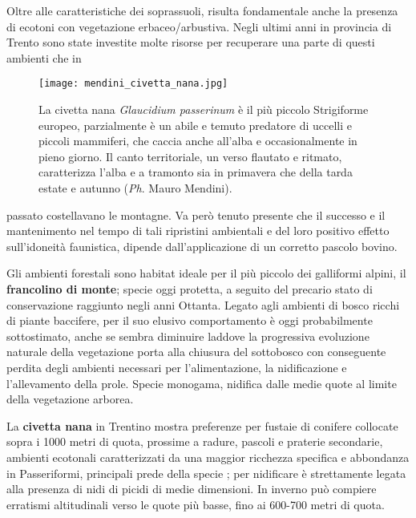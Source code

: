 \documentclass[10pt,twoside,openany,x11names,svgnames,italian,a5paper,dvipsnames,table]{memoir}
\newcommand{\ph}{\emph{Ph}. }
\begin{document}
Oltre alle caratteristiche dei soprassuoli, risulta fondamentale anche la presenza di ecotoni con vegetazione erbaceo/arbustiva. Negli ultimi anni in provincia di Trento sono state investite molte risorse per recuperare una parte di questi ambienti che in \begin{wrapfigure}{l}{.5\columnwidth}
\centering
  \texttt{[image: mendini\_civetta\_nana.jpg]}
  \caption*{La civetta nana \emph{Glaucidium passerinum} è il più piccolo Strigiforme europeo, parzialmente è un abile e temuto predatore di uccelli e piccoli mammiferi, che caccia anche all’alba e occasionalmente in pieno giorno. Il canto territoriale, un verso flautato e ritmato, caratterizza l’alba e a tramonto sia in primavera che della tarda estate e autunno (\ph Mauro Mendini).}
\end{wrapfigure}passato costellavano le montagne. Va però tenuto presente che il successo e il mantenimento nel tempo di tali ripristini ambientali e del loro positivo effetto sull’idoneità faunistica, dipende dall’applicazione di un corretto pascolo bovino. 

Gli ambienti forestali sono habitat ideale per il più piccolo dei galliformi alpini, il \textbf{francolino di monte}; specie oggi protetta, a seguito del precario stato di conservazione raggiunto negli anni Ottanta. Legato agli ambienti di bosco ricchi di piante baccifere, per il suo elusivo comportamento è oggi probabilmente sottostimato, anche se sembra diminuire laddove la progressiva evoluzione naturale della vegetazione porta alla chiusura del sottobosco con conseguente perdita degli ambienti necessari per l’alimentazione, la nidificazione e l’allevamento della prole. Specie monogama, nidifica dalle medie quote al limite della vegetazione arborea.

La \textbf{civetta nana} in Trentino mostra preferenze per fustaie di conifere collocate sopra i 1000 metri di quota, prossime a radure, pascoli e praterie secondarie, ambienti ecotonali caratterizzati da una maggior ricchezza specifica e abbondanza in Passeriformi, principali prede della specie \cite{Marchesi03}; per nidificare è strettamente legata alla presenza di nidi di picidi di medie dimensioni. In inverno può compiere erratismi altitudinali verso le quote più basse, fino ai 600-700 metri di quota.
\end{document}
